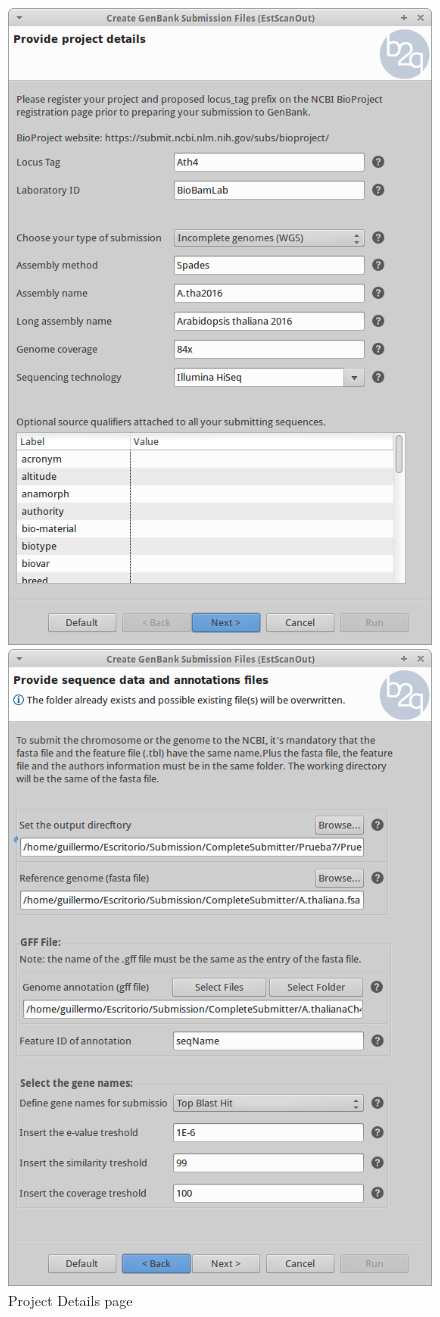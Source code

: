\begin{figure}
\centering
\begin{minipage}{.5\textwidth}
  \centering
  \includegraphics[width=0.8\linewidth]{img/WizardPage1.png}
  \caption{Project Details page}
  \label{fig:test1}
\end{minipage}%
\begin{minipage}{.5\textwidth}
  \centering
  \includegraphics[width=0.8\linewidth]{img/WizardPage2.png}

\end{minipage}
\end{figure}
